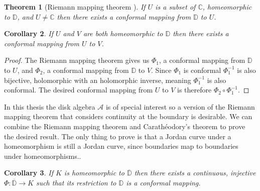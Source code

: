 \documentclass[a4paper,12pt,twoside,BCOR=10mm]{scrbook}
\newtheorem{theorem}{Theorem}[section]
\newtheorem{corollary}[theorem]{Corollary}
\theoremstyle{definition}
\theoremstyle{definition}
\theoremstyle{definition}
\begin{document}
\begin{theorem}[Riemann mapping theorem \citep{greenkrantz}]
If $U$ is a subset of $\mathbb{C}$, homeomorphic to $\mathbb{D}$, and $U \neq \mathbb{C}$ then there exists a conformal mapping from $\mathbb{D}$ to $U$.
\end{theorem}
\begin{corollary}
If $U$ and $V$ are both homeomorphic to $\mathbb{D}$ then there exists a conformal mapping from $U$ to $V$.
\end{corollary}
\begin{proof}
The Riemann mapping theorem gives us $\Phi_1$, a conformal mapping from $\mathbb{D}$ to $U$, and $\Phi_2$, a conformal mapping from $\mathbb{D}$ to $V$.
Since $\Phi_1$ is conformal $\Phi_1^{-1}$ is also bijective, holomorphic with an holomorphic inverse, meaning $\Phi_1^{-1}$ is also conformal.
The desired conformal mapping from $U$ to $V$ is therefore $\Phi_2 \circ \Phi_1^{-1}$.
\end{proof}
In this thesis the disk algebra $\mathcal{A}$ is of special interest so a version of the Riemann mapping theorem that considers continuity at the boundary is desirable.
We can combine the Riemann mapping theorem and Carathéodory's theorem to prove the desired result.
The only thing to prove is that a Jordan curve under a homeomorphism is still a Jordan curve, since boundaries map to boundaries under homeomorphisms..
\begin{corollary}
\label{contrmt}
If $K$ is homeomorphic to $\overline{\mathbb{D}}$ then there exists a continuous, injective $\Phi: \overline{\mathbb{D}} \rightarrow K$ such that its restriction to $\mathbb{D}$ is a conformal mapping.
\end{corollary}
\end{document}
